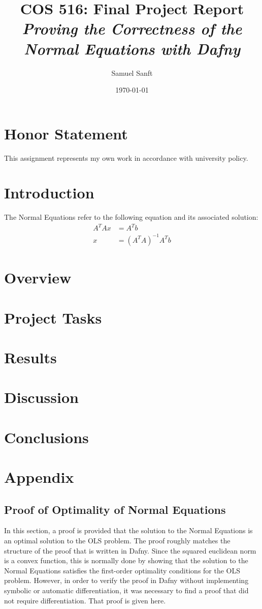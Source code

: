 \documentclass[12pt]{article}
\begin{document}
\title{COS 516: Final Project Report\\
\emph{Proving the Correctness of the Normal Equations with Dafny}} %
\author{Samuel Sanft}
\date{\today}
\maketitle

\section*{Honor Statement}
This assignment represents my own work in accordance with university policy.

\section{Introduction}
The Normal Equations refer to the following equation and its associated solution:
\begin{align*}
A^T A x &= A^T b \\
x &= (A^T A)^{-1} A^T b
\end{align*}

\section{Overview}

\section{Project Tasks}

\section{Results}

\section{Discussion}

\section{Conclusions}

\section{Appendix}
\subsection{Proof of Optimality of Normal Equations}
In this section, a proof is provided that the solution to the Normal Equations is an optimal solution to the OLS problem. The proof roughly matches the structure of the proof that is written in Dafny. Since the squared euclidean norm is a convex function, this is normally done by showing that the solution to the Normal Equations satisfies the first-order optimality conditions for the OLS problem. However, in order to verify the proof in Dafny without implementing symbolic or automatic differentiation, it was necessary to find a proof that did not require differentiation. That proof is given here.
\end{document}
